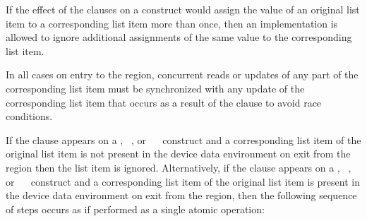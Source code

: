 \begin{note}
If the effect of the  clauses on a construct would assign the
value of an original list item to a corresponding list item more than once,
then an implementation is allowed to ignore additional assignments of
the same value to the corresponding list item.
\end{note}

In all cases on entry to the region, concurrent reads or updates of any part 
of the corresponding list item must be synchronized with any update of the 
corresponding list item that occurs as a result of the  clause to
avoid race conditions.

If the  clause appears on a , ~, 
or ~~ construct and a corresponding list item 
of the original list item is not present in the device data environment on exit 
from the region then the list item is ignored. Alternatively, if the  
clause appears on a , ~, or 
~~ construct and a corresponding list item of 
the original list item is present in the device data environment on exit from the 
region, then the following sequence of steps occurs as if performed as a single 
atomic operation:

